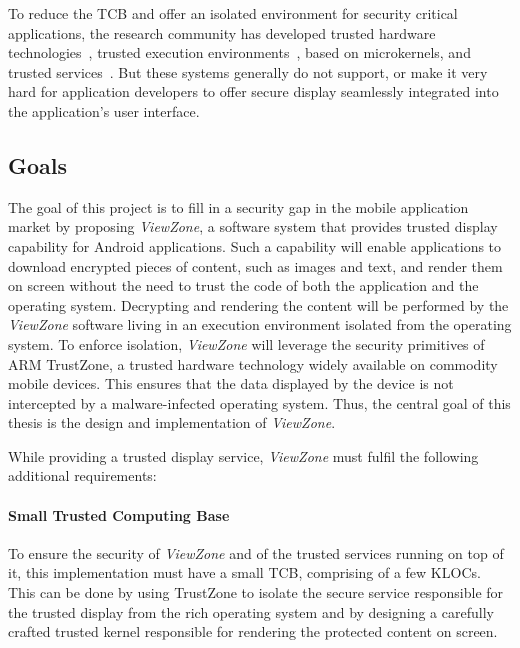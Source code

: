 To reduce the \ac{TCB} and offer an isolated environment for security critical applications, the research community has developed trusted hardware technologies~\cite{trustzone_whitepaper}, trusted execution environments~\cite{genode,knox_whitepaper,mcgillion2015open,sierra_tee}, based on microkernels, and trusted services~\cite{li2014droidvault,brasserregulating,li2014building,sun2015trustotp}. But these systems generally do not support, or make it very hard for application developers to offer secure display seamlessly integrated into the application's user interface.

\subsection{Goals}
The goal of this project is to fill in a security gap in the mobile application market by proposing \emph{ViewZone}, a software system that provides trusted display capability for Android applications. Such a capability will enable applications to download encrypted pieces of content, such as images and text, and render them on screen without the need to trust the code of both the application and the operating system. Decrypting and rendering the content will be performed by the \emph{ViewZone} software living in an execution environment isolated from the operating system. To enforce isolation, \emph{ViewZone} will leverage the security primitives of ARM TrustZone, a trusted hardware technology widely available on commodity mobile devices. This ensures that the data displayed by the device is not intercepted by a malware-infected operating system. Thus, the central goal of this thesis is the design and implementation of \emph{ViewZone}.

While providing a trusted display service, \emph{ViewZone} must fulfil the following additional requirements:

\paragraph*{\textbf{Small Trusted Computing Base\\}} To ensure the security of \emph{ViewZone} and of the trusted services running on top of it, this implementation must have a small \ac{TCB}, comprising of a few KLOCs. This can be done by using TrustZone to isolate the secure service responsible for the trusted display from the rich operating system and by designing a carefully crafted trusted kernel responsible for rendering the protected content on screen.

